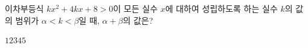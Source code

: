 \hspace*{2mm}\begin{minipage}[t]{\dimexpr\linewidth-2mm\relax}\vspace{0pt}
이차부등식 $kx^2+4kx+8>0$이 모든 실수 $x$에 대하여 성립하도록 하는 실수 $k$의 값의 범위가 $\alpha<k<\beta$일 때, $\alpha+\beta$의 값은?
\begin{choices32}{$1$}{$2$}{$3$}{$4$}{$5$}\end{choices32}\end{minipage}
